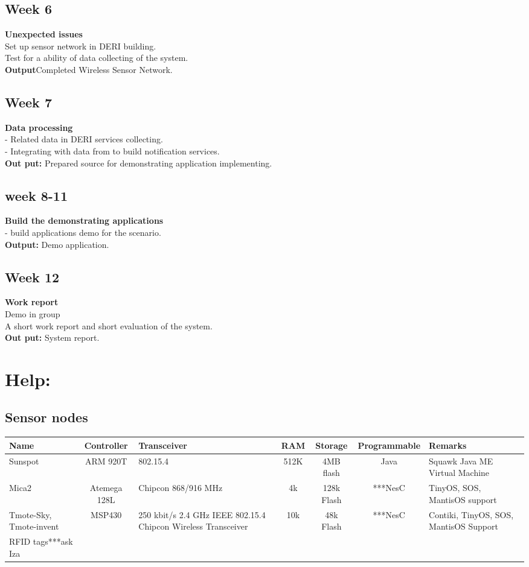 \documentclass[a4paper]{llncs}
\newcommand{\head}[1]{\textnormal {\textbf{#1}}}
\begin{document}
\subsection{Week 6}
\head{Unexpected issues}\\
Set up sensor network in DERI building.\\
Test for a ability of data collecting of the system.\\
\head{Output}Completed Wireless Sensor Network.
\subsection{Week 7}
\head{Data processing}\\
- Related data in DERI services collecting.\\
- Integrating with data from to build notification services.\\
\head{Out put: } Prepared source for demonstrating application implementing.
\subsection{week 8-11}
\head{Build the demonstrating applications}\\
- build applications demo for the scenario.\\
\head{Output: }  Demo application.
\subsection{Week 12}
\head{Work report}\\
Demo in group\\
A short work report and short evaluation of the system.\\
\head{Out put: } System report.

\section{Help:}

\subsection{Sensor nodes}
\begin{tabular}{|p{2.5cm}|c|p{2cm}|c|c|c|p{2.5cm}|}
\hline
\head{Name} & \head{Controller} & \head{Transceiver} & \head{RAM} & \head{Storage} &\head{Programmable} &\head{Remarks}\\
\hline
{Sunspot} & {ARM 920T} & {802.15.4} & {512K} & {4MB flash} & {Java } & {Squawk Java ME Virtual Machine} \\
\hline
{Mica2} & {Atemega 128L} & {Chipcon 868/916 MHz}& {4k} & {128k Flash} & {***NesC} & {TinyOS, SOS, MantisOS support} \\
\hline
{Tmote-Sky, Tmote-invent} & {MSP430} & {250 kbit/s 2.4 GHz IEEE 802.15.4 Chipcon Wireless Transceiver} & {10k} & {48k Flash} & {***NesC} & {Contiki, TinyOS, SOS, MantisOS Support}\\
\hline
{RFID tags***ask Iza} &{}&{}&{}&{}&{}&{}\\
\hline
\end{tabular}
\end{document}
